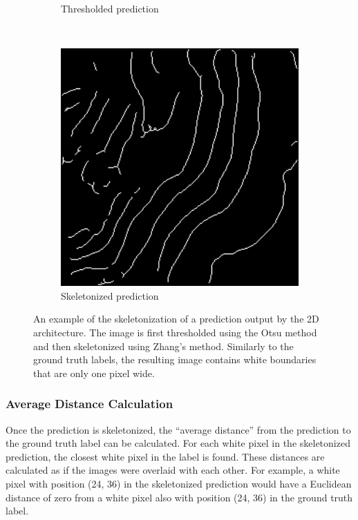 \begin{figure}[t]
\begin{subfigure}[t]{0.32\textwidth}
        \caption{Thresholded prediction}
    \end{subfigure}
    ~
    \begin{subfigure}[t]{0.32\textwidth}
        \centering
        \includegraphics[width=1\textwidth, valign=c]{images/skel-skel.png}
        \caption{Skeletonized prediction}
    \end{subfigure}
    \caption{An example of the skeletonization of a prediction output by the 2D architecture. The image is first thresholded using the Otsu method and then skeletonized using Zhang's method. Similarly to the ground truth labels, the resulting image contains white boundaries that are only one pixel wide.}
    \label{fig:skeletonisation}
\end{figure}

\subsubsection{Average Distance Calculation}

Once the prediction is skeletonized, the ``average distance'' from the prediction to the ground truth label can be calculated. For each white pixel in the skeletonized prediction, the closest white pixel in the label is found. These distances are calculated as if the images were overlaid with each other. For example, a white pixel with position (24, 36) in the skeletonized prediction would have a Euclidean distance of zero from a white pixel also with position (24, 36) in the ground truth label.

